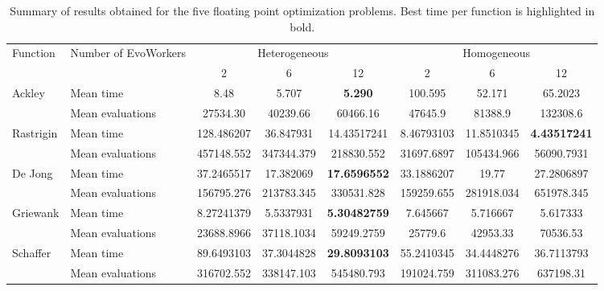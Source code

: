 \documentclass[conference]{IEEEtran}
\begin{document}
\begin{table}[t]
  \centering
  \caption{Summary of results obtained for the five floating point
      optimization problems. Best time per function is highlighted in bold.}
    \label{fig:summary}
    \begin{tabular}{|l|l|ccc|ccc|}
      \hline 
      \multirow{2}{*}{Function} & \multirow{2}{*}{Number of EvoWorkers} &  \multicolumn{3}{|c|}{Heterogeneous} & \multicolumn{3}{|c|}{Homogeneous}\\
      \cline{3-8}
                                & & 2 & 6 & 12 & 2 & 6 & 12\\
            \hline 
      \multirow{2}{*}{Ackley} & Mean time & 8.48&  5.707& {\bf 5.290} & 100.595 & 52.171 & 65.2023\\

                                & Mean evaluations & 27534.30 & 40239.66 & 60466.16 & 47645.9 & 81388.9 & 132308.6 \\
      \hline 
      \multirow{2}{*}{Rastrigin} & Mean time &  128.486207 & 36.847931 & 14.43517241 & 8.46793103 & 11.8510345 &  {\bf 4.43517241} \\

                                & Mean evaluations & 457148.552 & 347344.379 & 218830.552 & 31697.6897 & 105434.966 & 56090.7931 \\
      \hline
      \multirow{2}{*}{De Jong} & Mean time & 37.2465517 & 17.382069 & {\bf 17.6596552} & 33.1886207 & 19.77 & 27.2806897 \\


                                & Mean evaluations & 156795.276 & 213783.345 & 330531.828 & 159259.655 & 281918.034 & 651978.345 \\
      \hline
      \multirow{2}{*}{Griewank} & Mean time & 8.27241379 & 5.5337931 & {\bf 5.30482759} & 7.645667 & 5.716667 & 5.617333 \\


                                & Mean evaluations & 23688.8966 & 37118.1034 & 59249.2759 & 25779.6 & 42953.33 & 70536.53 \\
            \hline

      \multirow{2}{*}{Schaffer} & Mean time &  89.6493103 & 37.3044828 & {\bf 29.8093103} & 55.2410345 & 34.4448276 & 36.7113793 \\

                                & Mean evaluations & 316702.552  & 338147.103 & 545480.793 & 191024.759 & 311083.276 & 637198.31 \\
            \hline

       \end{tabular}

\end{table}
\end{document}
